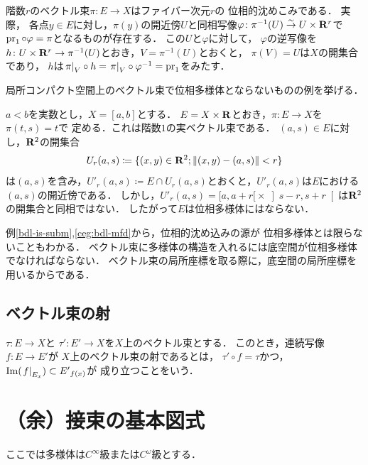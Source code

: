 \begin{EG}\label{bdl-is-subm}
  階数\(r\)のベクトル束\(\pi\colon E\to X\)はファイバー次元\(r\)の
  位相的沈めこみである．
  実際，
  各点\(y\in E\)に対し，\(\pi(y)\)の開近傍\(U\)と同相写像\(
      \varphi\colon \pi^{-1}(U)\simar U\times \rr^r
  \)で\(\pr_1\circ\varphi=\pi\)となるものが存在する．
  この\(U\)と\(\varphi\)に対して，
  \(\varphi\)の逆写像を\(
    h\colon U\times \rr^r \to \pi^{-1}(U)
  \)とおき，\(V= \pi^{-1}(U)\)とおくと，
  \(\pi(V)=U\)は\(X\)の開集合であり，
  \(h\)は\(
    \mres[\pi]{V}\circ h
    =\mres[\pi]{V}\circ \varphi^{-1}
    =\pr_1
  \)をみたす．    
\end{EG}

局所コンパクト空間上のベクトル束で位相多様体とならないものの例を挙げる．

\begin{EG}\label{ceg:bdl-mfd}
  \(a<b\)を実数とし，\(X=[a,b]\)とする．
  \(E=X\times\rr\)とおき，\(\pi\colon E\to X\)を\(\pi(t,s)=t\)で
  定める．これは階数\(1\)の実ベクトル束である．
  \((a,s)\in E\)に対し，\(\rr^2\)の開集合\[
    U_{r}(a,s)\coloneqq\{(x,y)\in\rr^2;\lVert{(x,y)-(a,s)}\rVert<r\}
  \]は\((a,s)\)を含み，\(
    U'_{r}(a,s)\coloneqq E\cap U_{r}(a,s)
  \)とおくと，\(U'_{r}(a,s)\)は\(E\)における\((a,s)\)の開近傍である．
  しかし，\(U'_{r}(a,s)={[a,a+r[}\times {\left]s-r,s+r\right[}\)は\(\rr^2\)の開集合と同相ではない．
  したがって\(E\)は位相多様体にはならない．
\end{EG}

例\ref{bdl-is-subm},\ref{ceg:bdl-mfd}から，位相的沈め込みの源が
位相多様体とは限らないこともわかる．
ベクトル束に多様体の構造を入れるには底空間が位相多様体でなければならない．
ベクトル束の局所座標を取る際に，底空間の局所座標を用いるからである．

\subsection{ベクトル束の射}
\(\tau\colon E\to X\)と
\(\tau'\colon E'\to X\)を\(X\)上のベクトル束とする．
このとき，連続写像\(f\colon E\to E'\)が
\(X\)上のベクトル束の射であるとは，
\(\tau'\circ f=\tau\)かつ，
\(\Img(\mres[f]{{E}_{x}})\subset {E'}_{f(x)}\)が
成り立つことをいう．

\section{（余）接束の基本図式}
ここでは多様体は\(C^\infty\)級または\(C^\omega\)級とする．

